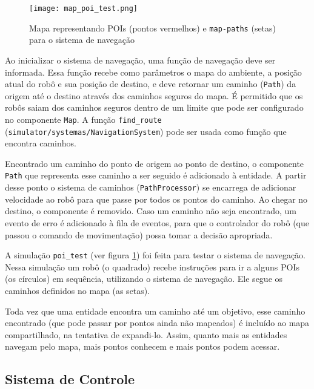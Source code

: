 \begin{figure}[ht]
    \centering
    \texttt{[image: map\_poi\_test.png]}
    \caption{Mapa representando POIs (pontos vermelhos) e \texttt{map-paths} (setas) para o sistema de navegação}
    \label{fig:navigation_map}
\end{figure}

Ao inicializar o sistema de navegação, uma função de navegação deve ser informada. Essa função recebe como parâmetros o mapa do ambiente, a posição atual do robô e sua posição de destino, e deve retornar um caminho (\texttt{Path}) da origem até o destino através dos caminhos seguros do mapa. É permitido que os robôs saiam dos caminhos seguros dentro de um limite que pode ser configurado no componente \texttt{Map}. A função \texttt{find\_route} (\texttt{simulator/systemas/NavigationSystem}) pode ser usada como função que encontra caminhos.

Encontrado um caminho do ponto de origem ao ponto de destino, o componente \texttt{Path} que representa esse caminho a ser seguido é adicionado à entidade. A partir desse ponto o sistema de caminhos (\texttt{PathProcessor}) se encarrega de adicionar velocidade ao robô para que passe por todos os pontos do caminho. Ao chegar no destino, o componente é removido. Caso um caminho não seja encontrado, um evento de erro é adicionado à fila de eventos, para que o controlador do robô (que passou o comando de movimentação) possa tomar a decisão apropriada.

A simulação \texttt{poi\_test} (ver figura \ref{fig:navigation_map}) foi feita para testar o sistema de navegação. Nessa simulação um robô (o quadrado) recebe instruções para ir a alguns POIs (os círculos) em sequência, utilizando o sistema de navegação. Ele segue os caminhos definidos no mapa (as setas). 

Toda vez que uma entidade encontra um caminho até um objetivo, esse caminho encontrado (que pode passar por pontos ainda não mapeados) é incluído ao mapa compartilhado, na tentativa de expandi-lo. Assim, quanto mais as entidades navegam pelo mapa, mais pontos conhecem e mais pontos podem acessar.

\subsection{Sistema de Controle}
\label{sec:scripting}

